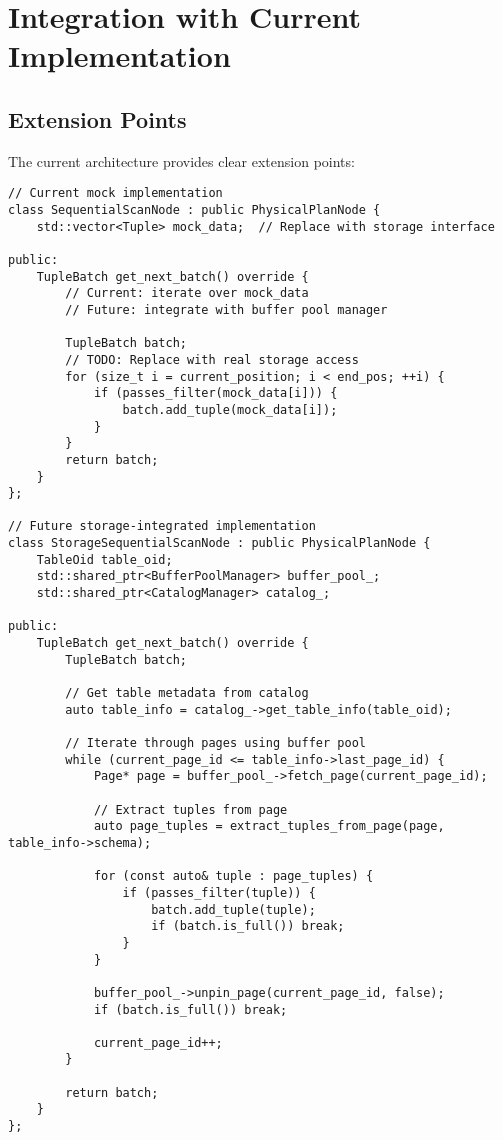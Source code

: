 \documentclass[12pt,a4paper]{article}
\begin{document}
    \section{Integration with Current Implementation}

    \subsection{Extension Points}

    The current architecture provides clear extension points:

    \begin{lstlisting}[style=cpp, caption=Storage Interface Extension Point]
// Current mock implementation
class SequentialScanNode : public PhysicalPlanNode {
    std::vector<Tuple> mock_data;  // Replace with storage interface

public:
    TupleBatch get_next_batch() override {
        // Current: iterate over mock_data
        // Future: integrate with buffer pool manager

        TupleBatch batch;
        // TODO: Replace with real storage access
        for (size_t i = current_position; i < end_pos; ++i) {
            if (passes_filter(mock_data[i])) {
                batch.add_tuple(mock_data[i]);
            }
        }
        return batch;
    }
};

// Future storage-integrated implementation
class StorageSequentialScanNode : public PhysicalPlanNode {
    TableOid table_oid;
    std::shared_ptr<BufferPoolManager> buffer_pool_;
    std::shared_ptr<CatalogManager> catalog_;

public:
    TupleBatch get_next_batch() override {
        TupleBatch batch;

        // Get table metadata from catalog
        auto table_info = catalog_->get_table_info(table_oid);

        // Iterate through pages using buffer pool
        while (current_page_id <= table_info->last_page_id) {
            Page* page = buffer_pool_->fetch_page(current_page_id);

            // Extract tuples from page
            auto page_tuples = extract_tuples_from_page(page, table_info->schema);

            for (const auto& tuple : page_tuples) {
                if (passes_filter(tuple)) {
                    batch.add_tuple(tuple);
                    if (batch.is_full()) break;
                }
            }

            buffer_pool_->unpin_page(current_page_id, false);
            if (batch.is_full()) break;

            current_page_id++;
        }

        return batch;
    }
};
    \end{lstlisting}
\end{document}
